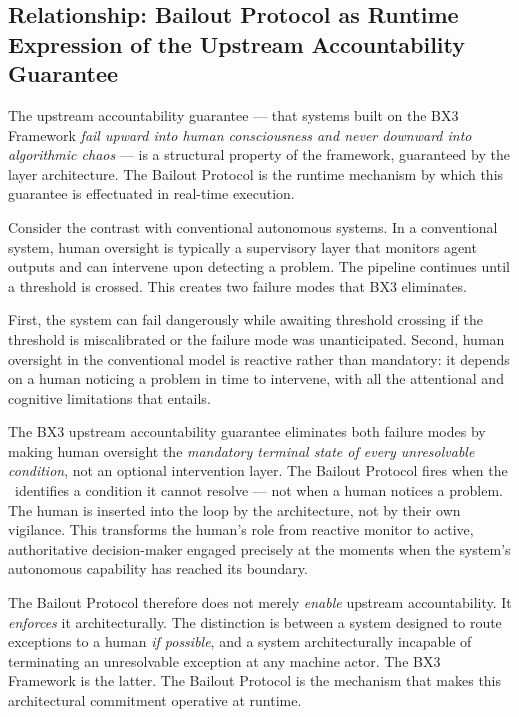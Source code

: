 \subsection{Relationship: Bailout Protocol as Runtime Expression of the Upstream Accountability Guarantee}
\label{sec:runtime-expression}

The upstream accountability guarantee --- that systems built on the BX3 Framework \textit{fail upward into human consciousness and never downward into algorithmic chaos} --- is a structural property of the framework, guaranteed by the layer architecture. The Bailout Protocol is the runtime mechanism by which this guarantee is effectuated in real-time execution.

Consider the contrast with conventional autonomous systems. In a conventional system, human oversight is typically a supervisory layer that monitors agent outputs and can intervene upon detecting a problem. The pipeline continues until a threshold is crossed. This creates two failure modes that BX3 eliminates.

First, the system can fail dangerously while awaiting threshold crossing if the threshold is miscalibrated or the failure mode was unanticipated. Second, human oversight in the conventional model is reactive rather than mandatory: it depends on a human noticing a problem in time to intervene, with all the attentional and cognitive limitations that entails.

The BX3 upstream accountability guarantee eliminates both failure modes by making human oversight the \textit{mandatory terminal state of every unresolvable condition}, not an optional intervention layer. The Bailout Protocol fires when the \bounds\ identifies a condition it cannot resolve --- not when a human notices a problem. The human is inserted into the loop by the architecture, not by their own vigilance. This transforms the human's role from reactive monitor to active, authoritative decision-maker engaged precisely at the moments when the system's autonomous capability has reached its boundary.

The Bailout Protocol therefore does not merely \textit{enable} upstream accountability. It \textit{enforces} it architecturally. The distinction is between a system designed to route exceptions to a human \textit{if possible}, and a system architecturally incapable of terminating an unresolvable exception at any machine actor. The BX3 Framework is the latter. The Bailout Protocol is the mechanism that makes this architectural commitment operative at runtime.

